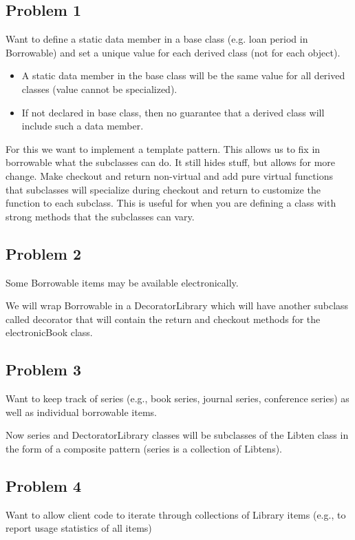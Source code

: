 \documentclass[12pt]{article}
\begin{document}
\subsection*{Problem 1}
Want to define a static data member in a base class (e.g. loan period in Borrowable) and set a unique value for each derived class (not for each object).
\begin{itemize}
  \item  A static data member in the base class will be the same value for all derived classes (value cannot be specialized).
  \item If not declared in base class, then no guarantee that a derived class will include such a data member.
\end{itemize}

For this we want to implement a template pattern. This allows us to fix in borrowable what the subclasses can do. It still hides stuff, but allows for more change.
Make checkout and return non-virtual and add pure virtual functions that subclasses will specialize during checkout and return to customize the function to each subclass. This is useful for when you are defining a class with strong methods that the subclasses can vary.

\subsection*{Problem 2}
Some Borrowable items may be available electronically.

We will wrap Borrowable in a DecoratorLibrary which will have another subclass called decorator that will contain the return and checkout methods for the electronicBook class.

\subsection*{Problem 3}
Want to keep track of series (e.g., book series, journal series, conference series) as well as individual borrowable items.

Now series and DectoratorLibrary classes will be subclasses of the Libten class in the form of a composite pattern (series is a collection of Libtens).

\subsection*{Problem 4}
Want to allow client code to iterate through collections of Library
items (e.g., to report usage statistics of all items)
\end{document}
